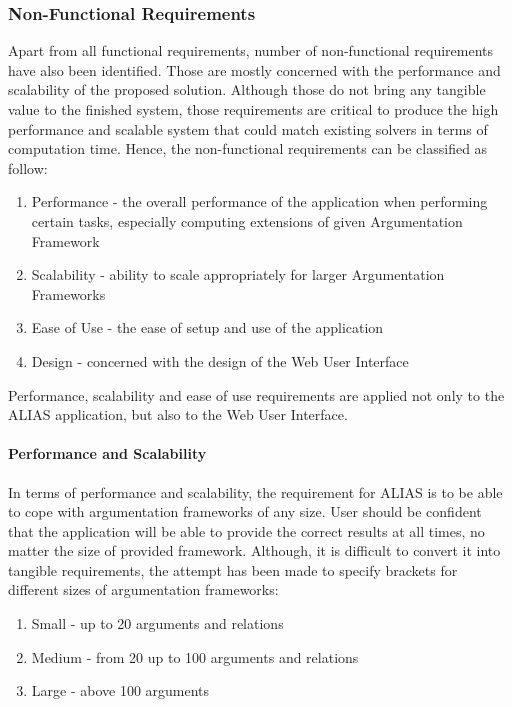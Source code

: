 \subsubsection{Non-Functional Requirements}
Apart from all functional requirements, number of non-functional requirements have also been identified. Those are mostly concerned with the performance and scalability of the proposed solution. Although those do not bring any tangible value to the finished system, those requirements are critical to produce the high performance and scalable system that could match existing solvers in terms of computation time. Hence, the non-functional requirements can be classified as follow:

\begin{enumerate}
	\item Performance - the overall performance of the application when performing certain tasks, especially computing extensions of given Argumentation Framework
	\item Scalability - ability to scale appropriately for larger Argumentation Frameworks
	\item Ease of Use - the ease of setup and use of the application 
	\item Design - concerned with the design of the Web User Interface
\end{enumerate}

Performance, scalability and ease of use requirements are applied not only to the ALIAS application, but also to the Web User Interface. 

\paragraph{Performance and Scalability}

In terms of performance and scalability, the requirement for ALIAS is to be able to cope with argumentation frameworks of any size. User should be confident that the application will be able to provide the correct results at all times, no matter the size of provided framework. Although, it is difficult to convert it into tangible requirements, the attempt has been made to specify brackets for different sizes of argumentation frameworks: 

\begin{enumerate}
	\item Small - up to 20 arguments and relations
	\item Medium - from 20 up to 100 arguments and relations
	\item Large - above 100 arguments 
\end{enumerate}

